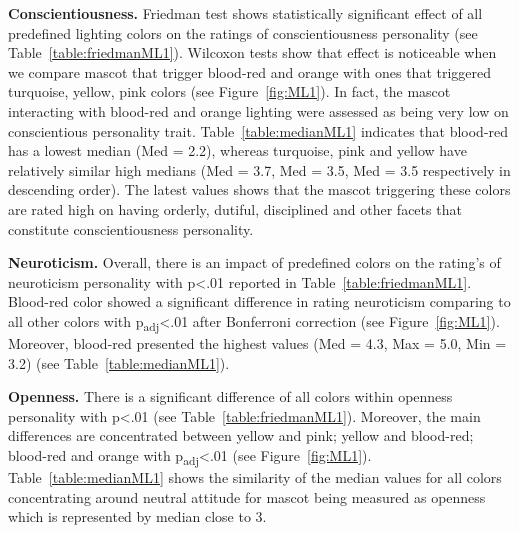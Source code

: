 \par\textbf{Conscientiousness.}
Friedman test shows statistically significant effect of all predefined lighting colors
on the ratings of conscientiousness personality (see Table~\ref{table:friedmanML1}).
Wilcoxon tests show that effect is noticeable when we compare mascot that trigger
blood-red and orange with ones that triggered turquoise, yellow, pink colors (see Figure~\ref{fig:ML1}).
In fact, the mascot interacting with blood-red and orange lighting were assessed
as being very low on conscientious personality trait.
Table~\ref{table:medianML1} indicates that blood-red has a lowest median (Med = 2.2), whereas turquoise, pink and
yellow have relatively similar high medians (Med = 3.7, Med = 3.5, Med = 3.5 respectively in descending order).
The latest values shows that the mascot triggering these colors are rated high on having
orderly, dutiful, disciplined and other facets that constitute conscientiousness personality.

\par\textbf{Neuroticism.}
Overall, there is an impact of predefined colors on the rating's of neuroticism
personality with p<.01 reported in Table~\ref{table:friedmanML1}.
Blood-red color showed a significant difference in rating neuroticism comparing
to all other colors with p\textsubscript{adj}<.01 after Bonferroni correction (see Figure~\ref{fig:ML1}).
Moreover, blood-red presented the highest values (Med = 4.3, Max = 5.0, Min = 3.2) (see Table~\ref{table:medianML1}).

\par\textbf{Openness.}
There is a significant difference of all colors within openness personality
with p<.01 (see Table~\ref{table:friedmanML1}).
Moreover, the main differences are concentrated between yellow and pink;
yellow and blood-red;
blood-red and orange with p\textsubscript{adj}<.01 (see Figure~\ref{fig:ML1}).
Table~\ref{table:medianML1} shows the similarity of the median values for all colors concentrating around neutral attitude for mascot
being measured as openness which is represented by median close to 3.

